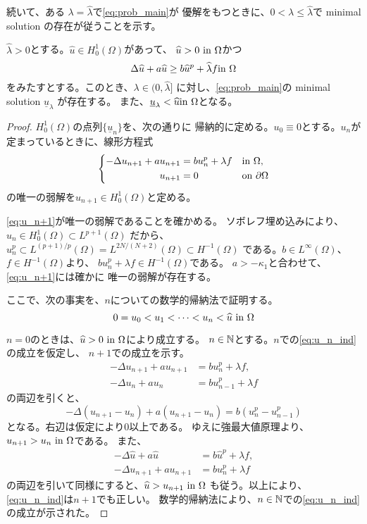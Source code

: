 続いて、ある
$\lambda = \hat{\lambda}$で\ref{eq:prob_main}が
優解をもつときに、$0 < \lambda \leq \hat{\lambda}$で
minimal solution の存在が従うことを示す。

\begin{lem} \label{lem:minimal_itt}
 $\hat{\lambda} > 0$とする。$\hat{u} \in H_0^1(\Omega)$があって、
 $\widehat{u} > 0 ~\text{in}~ \Omega$かつ
 \[
  \Delta \widehat{u} + a\widehat{u} \geq b \widehat{u}^p + \widehat{\lambda}f
 \text{in}~ \Omega
 \]
 をみたすとする。このとき、$\lambda \in (0,\hat{\lambda} ]$
 に対し、\ref{eq:prob_main}の minimal solution $\underline{u}_\lambda$
 が存在する。
 また、$\underline{u}_\lambda < \widehat{u} \text{in}~ \Omega$となる。
\end{lem}

\begin{proof}
 $H_0^1(\Omega)$の点列$\{ \underline{u}_n \}$を、次の通りに
 帰納的に定める。$u_0 \equiv 0$とする。$u_n$が
 定まっているときに、線形方程式
  \begin{align}
   \left\{
   \begin{aligned}
    -\Delta u_{n+1} + a u_{n+1} 
    &= b u_n^p + \lambda f  & &\text{in}~ \Omega,  \\
    u_{n+1} &= 0 & &\text{on}~ \partial\Omega
   \end{aligned}
   \right. \label{eq:u_n+1}
  \end{align}
 の唯一の弱解を$u_{n+1} \in H_0^1(\Omega)$と定める。
 
 \eqref{eq:u_n+1}が唯一の弱解であることを確かめる。
 ソボレフ埋め込みにより、
 $
  u_n \in H_0^1(\Omega) \subset L^{p+1}(\Omega)
 $
 だから、
 $
  u_n^p \subset L^{(p+1)/p}(\Omega)
 = L^{2N/(N+2)}(\Omega) \subset H^{-1}(\Omega)
 $
 である。$b \in L^\infty(\Omega)$、$f \in H^{-1}(\Omega)$より、
 $b u_n^p + \lambda f \in H^{-1}(\Omega)$である。
 $a > -\kappa_1$と合わせて、\eqref{eq:u_n+1}には確かに
 唯一の弱解が存在する。

 ここで、次の事実を、$n$についての数学的帰納法で証明する。
 \begin{equation}
  0 = u_0 < u_1 < \dots < u_n < \widehat{u} ~\text{in}~ \Omega \label{eq:u_n_ind}
 \end{equation}

 $n = 0$のときは、$\widehat{u} > 0 ~\text{in}~ \Omega$により成立する。
 $n \in \mathbb{N}$とする。$n$での\eqref{eq:u_n_ind}の成立を仮定し、
 $n+1$での成立を示す。
 \begin{align*}
  -\Delta u_{n+1} + a u_{n+1} &= b u_n^p + \lambda f, \\
  -\Delta u_{n} + a u_{n} &= b u_{n-1}^p + \lambda f
 \end{align*}
 の両辺を引くと、
 \[
  -\Delta (u_{n+1} - u_n) + a(u_{n+1} - u_n) = b(u_n^p - u_{n-1}^p)
 \]
 となる。右辺は仮定により$0$以上である。
 ゆえに強最大値原理より、$u_{n+1} > u_n ~\text{in}~\Omega$である。
 また、
 \begin{align*}
  -\Delta \hat{u} + a \hat{u} &= b \hat{u}^p + \lambda f, \\
  -\Delta u_{n+1} + a u_{n+1} &= b u_{n}^p + \lambda f
 \end{align*}
 の両辺を引いて同様にすると、$\widehat{u} > u_{n+1} ~\text{in}~\Omega$
 も従う。以上により、\eqref{eq:u_n_ind}は$n+1$でも正しい。
 数学的帰納法により、$n \in \mathbb{N}$での\eqref{eq:u_n_ind}の成立が示された。


\end{proof}
